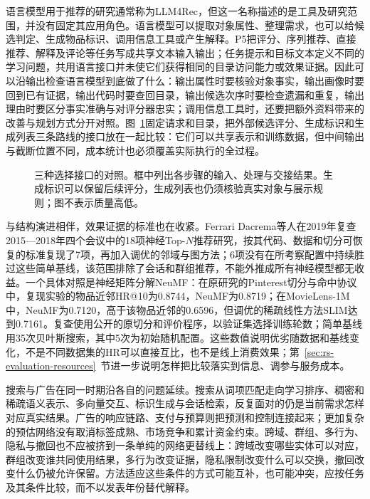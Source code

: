 语言模型用于推荐的研究通常称为LLM4Rec，但这一名称描述的是工具及研究范围，并没有固定其应用角色。语言模型可以提取对象属性、整理需求，也可以给候选判定、生成物品标识、调用信息工具或产生解释。P5把评分、序列推荐、直接推荐、解释及评论等任务写成共享文本输入输出；任务提示和目标文本定义不同的学习问题，共用语言接口并未使它们获得相同的目录访问能力或效果证据。因此可以沿输出检查语言模型到底做了什么：输出属性时要核验对象事实，输出画像时要回到已有证据，输出代码时要查回目录，输出候选次序时要检查遗漏和重复，输出理由时要区分事实准确与对评分器忠实；调用信息工具时，还要把额外资料带来的改善与规划方式分开对照。图~\ref{fig:rs-interface-comparison}固定请求和目录，把外部候选评分、生成标识和生成列表三条路线的接口放在一起比较：它们可以共享表示和训练数据，但中间输出与截断位置不同，成本统计也必须覆盖实际执行的全过程。

\begin{figure}[htbp]
  \centering
  
  \caption{三种选择接口的对照。框中列出各步骤的输入、处理与交接结果。生成标识可以保留后续评分，生成列表也仍须核验真实对象与展示规则；图不表示质量高低。}
  \label{fig:rs-interface-comparison}
\end{figure}

与结构演进相伴，效果证据的标准也在收紧。Ferrari Dacrema等人在2019年复查2015—2018年四个会议中的18项神经Top-$N$推荐研究，按其代码、数据和切分可恢复的标准复现了7项，再加入调优的邻域与图方法；6项没有在所考察配置中持续胜过这些简单基线，该范围排除了会话和群组推荐，不能外推成所有神经模型都无收益。一个具体对照是神经矩阵分解NeuMF：在原研究的Pinterest切分与命中协议中，复现实验的物品近邻HR@10为0.8744，NeuMF为0.8719；在MovieLens-1M中，NeuMF为0.7120，高于该物品近邻的0.6596，但调优的稀疏线性方法SLIM达到0.7161。复查使用公开的原切分和评价程序，以验证集选择训练轮数；简单基线用35次贝叶斯搜索，其中5次为初始随机配置。这些数值说明优劣随数据和基线变化，不是不同数据集的HR可以直接互比，也不是线上消费效果；第~\ref{sec:rs-evaluation-resources}~节进一步说明怎样把比较落实到信息、调参与服务成本。

搜索与广告在同一时期沿各自的问题延续。搜索从词项匹配走向学习排序、稠密和稀疏语义表示、多向量交互、标识生成与会话检索，反复面对的仍是当前需求怎样对应真实结果。广告的响应链路、支付与预算则把预测和控制连接起来；更加复杂的预估网络没有取消标签成熟、市场竞争和累计资金约束。跨域、群组、多行为、隐私与撤回也不应被挤到一条单纯的网络更替线上：跨域改变哪些实体可以对应，群组改变谁共同使用结果，多行为改变证据，隐私限制改变什么可以交换，撤回改变什么仍被允许保留。方法适应这些条件的方式可能互补，也可能冲突，应按任务及其条件比较，而不以发表年份替代解释。

